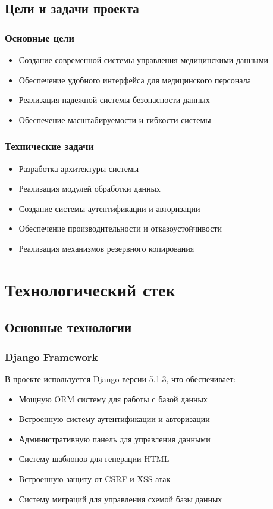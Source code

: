 \documentclass[12pt,a4paper]{article}
\begin{document}
\subsection{Цели и задачи проекта}
\subsubsection{Основные цели}
\begin{itemize}
    \item Создание современной системы управления медицинскими данными
    \item Обеспечение удобного интерфейса для медицинского персонала
    \item Реализация надежной системы безопасности данных
    \item Обеспечение масштабируемости и гибкости системы
\end{itemize}

\subsubsection{Технические задачи}
\begin{itemize}
    \item Разработка архитектуры системы
    \item Реализация модулей обработки данных
    \item Создание системы аутентификации и авторизации
    \item Обеспечение производительности и отказоустойчивости
    \item Реализация механизмов резервного копирования
\end{itemize}

\section{Технологический стек}
\subsection{Основные технологии}
\subsubsection{Django Framework}
В проекте используется Django версии 5.1.3, что обеспечивает:
\begin{itemize}
    \item Мощную ORM систему для работы с базой данных
    \item Встроенную систему аутентификации и авторизации
    \item Административную панель для управления данными
    \item Систему шаблонов для генерации HTML
    \item Встроенную защиту от CSRF и XSS атак
    \item Систему миграций для управления схемой базы данных
\end{itemize}
\end{document}
